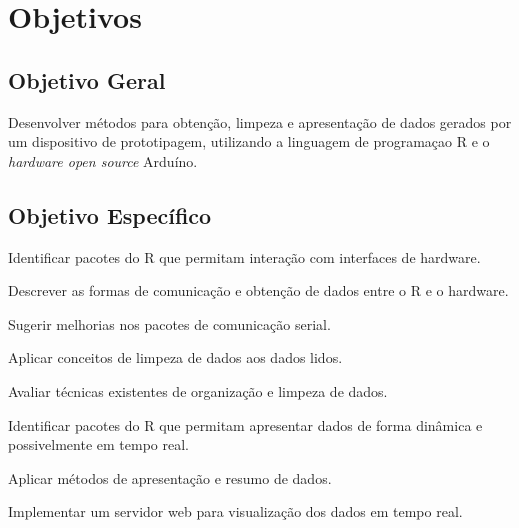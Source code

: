 \chapter[Objetivos]{Objetivos}

\section{Objetivo Geral}\label{sec-objetivoGeral}

Desenvolver métodos para obtenção, limpeza e apresentação de dados gerados por 
um dispositivo de prototipagem, utilizando a linguagem de programaçao R e o 
\emph{hardware open source} Arduíno.

\section{Objetivo Específico}\label{sec-objetivoEspecifico}

\begin{alineas}
  
  \item Identificar pacotes do R que permitam interação com interfaces de hardware.
  \item Descrever as formas de comunicação e obtenção de dados entre o R e o hardware.
  \item Sugerir melhorias nos pacotes de comunicação serial.
  \item Aplicar conceitos de limpeza de dados aos dados lidos.
  \item Avaliar técnicas existentes de organização e limpeza de dados.
  \item Identificar pacotes do R que permitam apresentar dados de forma dinâmica e 
  possivelmente em tempo real.
  \item Aplicar métodos de apresentação e resumo de dados.
  \item Implementar um servidor web para visualização dos dados em tempo real.
  
\end{alineas}